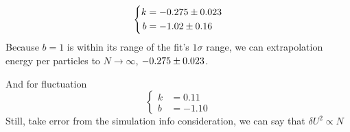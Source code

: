 \documentclass[UTF8,a4paper]{article}
\begin{document}
\begin{equation}
	\left\{
		\begin{aligned}
			k &= \num[separate-uncertainty = true]{-0.275+-0.023}\\
			b &= \num[separate-uncertainty = true]{-1.02+-0.16}
		\end{aligned}
	\right.
\end{equation}
Because $b=1$ is within its range of the fit's $1\sigma$ range, we can extrapolation energy per particles to $N\to \infty$, $\num[separate-uncertainty = true]{-0.275+-0.023}$.

And for fluctuation
\begin{equation}
	\left\{
		\begin{aligned}
			k &= 0.11\\
			b &= -1.10
		\end{aligned}
	\right.
\end{equation}
Still, take error from the simulation info consideration, we can say that $\delta U^2\propto N$
\end{document}

